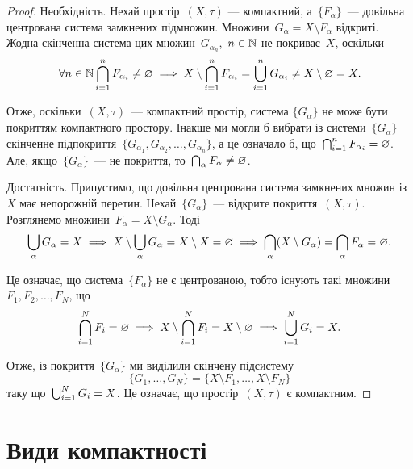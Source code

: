 \begin{proof}
Необхідність. Нехай простір~$(X, \tau)$ ---
компактний, а~$\{F_\alpha\}$~--- довільна центрована система
замкнених підмножин. Множини~$G_\alpha = X \setminus F_\alpha$ відкриті.
Жодна скінченна система цих множин~$G_{\alpha_n}$,~$n \in \mathbb{N}$ не
покриває~$X$, оскільки
\begin{equation*}
\forall n \in \mathbb{N} \operatorname*{\bigcap}_{i = 1}^n F_{\alpha_i} \ne \varnothing \implies
X \setminus \operatorname*{\bigcap}_{i = 1}^n F_{\alpha_i} =
\operatorname*{\bigcup}_{i = 1}^n G_{\alpha_i} \ne X \setminus \varnothing = X.
\end{equation*}

Отже, оскільки~$(X, \tau)$~--- компактний простір, система
$\{G_\alpha\}$ не може бути покриттям компактного простору.
Інакше ми могли б вибрати із системи~$\{G_\alpha\}$ скінченне
підпокриття~$\{G_{\alpha_1}, G_{\alpha_2}, \dots, G_{\alpha_n}\}$,
а це означало б, що~$\operatorname*{\bigcap}_{i = 1}^n F_{\alpha_i} = \varnothing$.
Але, якщо~$\{G_\alpha\}$~--- не покриття, то~$\operatorname*{\bigcap}_\alpha F_\alpha \ne \varnothing$.

Достатність. Припустимо, що довільна центрована
система замкнених множин із~$X$ має непорожній перетин.
Нехай~$\{G_\alpha\}$~--- відкрите покриття~$(X, \tau)$. Розглянемо
множини~$F_\alpha = X \setminus G_\alpha$. Тоді
\begin{equation*}
\operatorname*{\bigcup}_\alpha G_\alpha = X \implies
X \setminus \operatorname*{\bigcup}_\alpha G_\alpha = X \setminus X = \varnothing \implies
\operatorname*{\bigcap}_\alpha (X \setminus G_\alpha) =
\operatorname*{\bigcap}_\alpha F_\alpha = \varnothing.
\end{equation*}

Це означає, що система~$\{F_\alpha\}$ не є центрованою, тобто
існують такі множини~$F_1, F_2, \dots, F_N$, що
\begin{equation*}
\operatorname*{\bigcap}_{i = 1}^N F_i = \varnothing \implies
X \setminus \operatorname*{\bigcap}_{i = 1}^N F_i = X \setminus \varnothing \implies
\operatorname*{\bigcup}_{i = 1}^N G_i = X.
\end{equation*}

Отже, із покриття~$\{G_\alpha\}$ ми виділили скінчену підсистему
\begin{equation*}
\{G_1, \dots, G_N\} = \{X \setminus F_1, \dots, X \setminus F_N\}
\end{equation*}
таку що~$\operatorname*{\bigcup}_{i = 1}^N G_i = X$. Це означає, що простір~$(X, \tau)$ є
компактним.
\end{proof}

\section{Види компактності}

